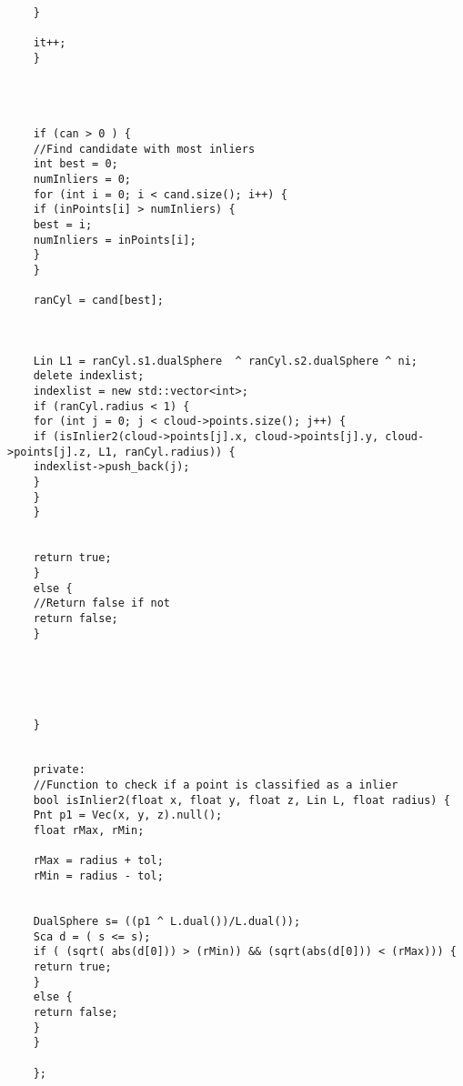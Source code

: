 {\begin{lstlisting}[caption={Archivo ransac.h}]
	
	}
	
	it++;
	}
	
	
	
	
	if (can > 0 ) {
	//Find candidate with most inliers
	int best = 0;
	numInliers = 0;
	for (int i = 0; i < cand.size(); i++) {
	if (inPoints[i] > numInliers) {
	best = i;
	numInliers = inPoints[i];
	}
	}
	
	ranCyl = cand[best];
	
	
	
	Lin L1 = ranCyl.s1.dualSphere  ^ ranCyl.s2.dualSphere ^ ni;
	delete indexlist;
	indexlist = new std::vector<int>;
	if (ranCyl.radius < 1) {
	for (int j = 0; j < cloud->points.size(); j++) {
	if (isInlier2(cloud->points[j].x, cloud->points[j].y, cloud->points[j].z, L1, ranCyl.radius)) {
	indexlist->push_back(j);
	}
	}
	}
	
	
	return true;
	}
	else {
	//Return false if not
	return false;
	}
	
	
	
	
	
	}
	
	
	private:
	//Function to check if a point is classified as a inlier
	bool isInlier2(float x, float y, float z, Lin L, float radius) {
	Pnt p1 = Vec(x, y, z).null();
	float rMax, rMin;
	
	rMax = radius + tol;
	rMin = radius - tol;
	
	
	DualSphere s= ((p1 ^ L.dual())/L.dual());
	Sca d = ( s <= s);
	if ( (sqrt( abs(d[0])) > (rMin)) && (sqrt(abs(d[0])) < (rMax))) {
	return true;
	}
	else {
	return false;
	}
	}
	
	};
	
	
	
	\end{lstlisting}
}$ $ \\


